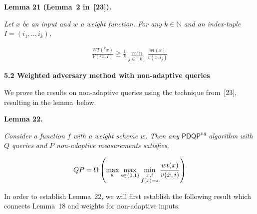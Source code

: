 \documentclass[10pt,a4paper]{article}
\begin{document}


\par\medskip\noindent\textbf{
\textbf{Lemma 21}\textbf{ }(Lemma 2 in [23])\textbf{.}
}\par



\emph{Let $x$ be an input and $w$ a weight function. For any $k\in\mathbb{N}$ and an index-tuple $I=(i_{1},..,i_{k})$,}\par


\[\begin{gathered}
\displaystyle\frac{WT({}^{k}x)}{V({}^{k}x,I)}\geq\frac{1}{k}\min_{j\in[k]}\frac{wt(x)}{v(x,i_{j})}
\end{gathered}\]







\par\medskip\noindent\textbf{
5.2 Weighted adversary method with non-adaptive queries}\par




We prove the results on non-adaptive queries using the technique from [23], resulting in the lemma below.\par





\par\medskip\noindent\textbf{
\textbf{Lemma 22}\textbf{.}
}\par



\emph{Consider a function $f$ with a weight scheme $w$. Then any $\mathsf{PDQP}^{nq}$ algorithm with $Q$ queries and $P$ non-adaptive measurements satisfies,}\par


\[\begin{gathered}
\displaystyle QP=\Omega\left(\max_{w}\max_{s\in\{0,1\}}\min_{\begin{subarray}{c}x,i\\
f(x)=s\end{subarray}}\frac{wt(x)}{v(x,i)}\right)
\end{gathered}\]






In order to establish Lemma 22, we will first establish the following result which connects Lemma 18 and weights for non-adaptive inputs.\par
\end{document}
